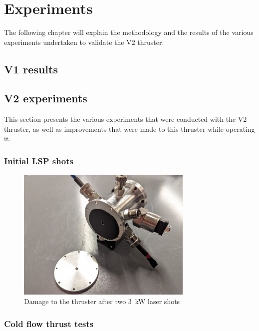 \chapter{Experiments}

    The following chapter will explain the methodology and the results of the various experiments undertaken to validate the V2 thruster.

    \section{V1 results}


    \section{V2 experiments}
        This section presents the various experiments that were conducted with the V2 thruster, as well as improvements that were made to this thruster while operating it.
    
        \subsection{Initial LSP shots}

            \begin{figure}[!ht]
                \centering
                \includegraphics[width=0.75\textwidth]{assets/4 experiments/V2 test damage.jpg}
                \caption{Damage to the thruster after two \qty{3}{kW} laser shots}
            \end{figure}

        
        \subsection{Cold flow thrust tests}

